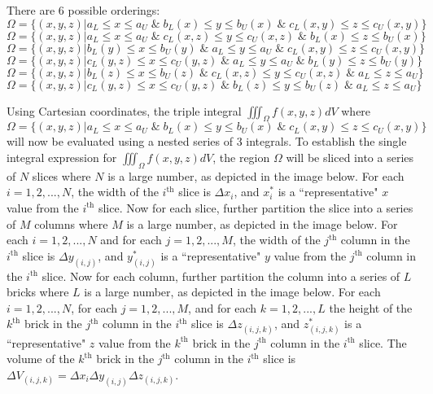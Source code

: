 \documentclass{article}
\begin{document}
There are 6 possible orderings:
\[\Omega = \{(x,y,z) | a_L \leq x \leq a_U \;\&\; b_L(x) \leq y \leq b_U(x) \;\&\; c_L(x,y) \leq z \leq c_U(x,y)\}\]
\[\Omega = \{(x,y,z) | a_L \leq x \leq a_U \;\&\; c_L(x,z) \leq y \leq c_U(x,z) \;\&\; b_L(x) \leq z \leq b_U(x)\}\]
\[\Omega = \{(x,y,z) | b_L(y) \leq x \leq b_U(y) \;\&\; a_L \leq y \leq a_U \;\&\; c_L(x,y) \leq z \leq c_U(x,y)\}\]
\[\Omega = \{(x,y,z) | c_L(y,z) \leq x \leq c_U(y,z) \;\&\; a_L \leq y \leq a_U \;\&\; b_L(y) \leq z \leq b_U(y)\}\]
\[\Omega = \{(x,y,z) | b_L(z) \leq x \leq b_U(z) \;\&\; c_L(x,z) \leq y \leq c_U(x,z) \;\&\; a_L \leq z \leq a_U\}\]
\[\Omega = \{(x,y,z) | c_L(y,z) \leq x \leq c_U(y,z) \;\&\; b_L(z) \leq y \leq b_U(z) \;\&\; a_L \leq z \leq a_U\}\]

Using Cartesian coordinates, the triple integral \(\iiint_{\Omega} f(x,y,z)dV\) where
\[\Omega = \{(x,y,z) | a_L \leq x \leq a_U \;\&\; b_L(x) \leq y \leq b_U(x) \;\&\; c_L(x,y) \leq z \leq c_U(x,y)\}\]
will now be evaluated using a nested series of 3 integrals. To establish the single integral expression for \(\iiint_{\Omega} f(x,y,z)dV\), the region \(\Omega\) will be sliced into a series of \(N\) slices where \(N\) is a large number, as depicted in the image below. For each \(i = 1, 2, ..., N\), the width of the \(i^{\text{th}}\) slice is \(\Delta x_i\), and \(x_i^*\) is a ``representative" \(x\) value from the \(i^{\text{th}}\) slice. 
Now for each slice, further partition the slice into a series of \(M\) columns where \(M\) is a large number, as depicted in the image below. For each \(i = 1, 2, ..., N\) and for each \(j = 1, 2, ..., M\), the width of the \(j^{\text{th}}\) column in the \(i^{\text{th}}\) slice is \(\Delta y_{(i,j)}\), and \(y_{(i,j)}^*\) is a ``representative" \(y\) value from the \(j^{\text{th}}\) column in the \(i^{\text{th}}\) slice. 
Now for each column, further partition the column into a series of \(L\) bricks where \(L\) is a large number, as depicted in the image below. For each \(i = 1, 2, ..., N\), for each \(j = 1, 2, ..., M\), and for each \(k = 1, 2, ..., L\) the height of the \(k^{\text{th}}\) brick in the \(j^{\text{th}}\) column in the \(i^{\text{th}}\) slice is \(\Delta z_{(i,j,k)}\), and \(z_{(i,j,k)}^*\) is a ``representative" \(z\) value from the \(k^{\text{th}}\) brick in the \(j^{\text{th}}\) column in the \(i^{\text{th}}\) slice. The volume of the \(k^{\text{th}}\) brick in the \(j^{\text{th}}\) column in the \(i^{\text{th}}\) slice is \(\Delta V_{(i,j,k)} = \Delta x_i \Delta y_{(i,j)} \Delta z_{(i,j,k)}\).   
\end{document}

